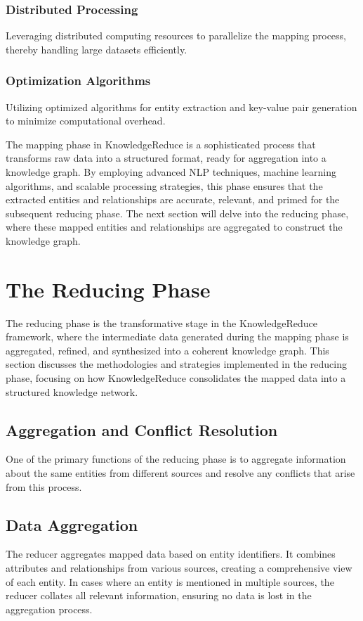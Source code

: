 \documentclass{article}
\begin{document}
\subsubsection{Distributed Processing} 
Leveraging distributed computing resources to parallelize the mapping process, thereby handling large datasets efficiently.
\subsubsection{Optimization Algorithms}
Utilizing optimized algorithms for entity extraction and key-value pair generation to minimize computational overhead.

The mapping phase in KnowledgeReduce is a sophisticated process that transforms raw data into a structured format, ready for aggregation into a knowledge graph. By employing advanced NLP techniques, machine learning algorithms, and scalable processing strategies, this phase ensures that the extracted entities and relationships are accurate, relevant, and primed for the subsequent reducing phase. The next section will delve into the reducing phase, where these mapped entities and relationships are aggregated to construct the knowledge graph.
\section{The Reducing Phase}
The reducing phase is the transformative stage in the KnowledgeReduce framework, where the intermediate data generated during the mapping phase is aggregated, refined, and synthesized into a coherent knowledge graph. This section discusses the methodologies and strategies implemented in the reducing phase, focusing on how KnowledgeReduce consolidates the mapped data into a structured knowledge network.

\subsection{Aggregation and Conflict Resolution}
One of the primary functions of the reducing phase is to aggregate information about the same entities from different sources and resolve any conflicts that arise from this process.

\subsection{Data Aggregation}
The reducer aggregates mapped data based on entity identifiers. It combines attributes and relationships from various sources, creating a comprehensive view of each entity.
In cases where an entity is mentioned in multiple sources, the reducer collates all relevant information, ensuring no data is lost in the aggregation process.
\end{document}
